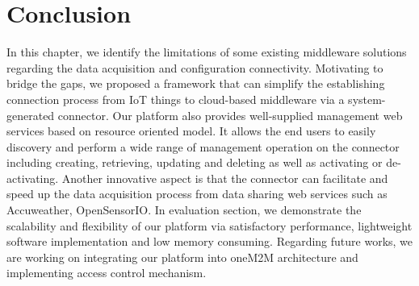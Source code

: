 \section{Conclusion}
In this chapter, we identify the limitations of some existing middleware solutions regarding the data acquisition and configuration connectivity. Motivating to bridge the gaps, we proposed a framework that can simplify the establishing connection process from IoT things to cloud-based middleware via a system-generated connector. Our platform also provides well-supplied management web services based on resource oriented model. It allows the end users to easily discovery and perform a wide range of management operation on the connector including creating, retrieving, updating and deleting as well as activating or de-activating. Another innovative aspect is that the connector can facilitate and speed up the data acquisition process from data sharing web services such as Accuweather, OpenSensorIO. In evaluation section, we demonstrate the scalability and flexibility of our platform via satisfactory performance, lightweight software implementation and low memory consuming. Regarding future works, we are working on integrating our platform into oneM2M architecture and implementing access control mechanism.

